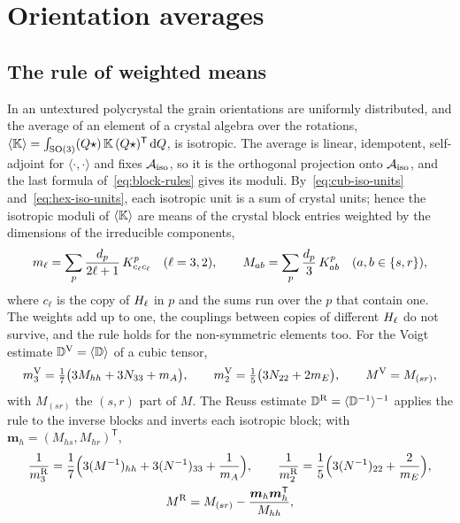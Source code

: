 \section{Orientation averages}\label{sec:averages}

\subsection{The rule of weighted means}\label{sec:averages-rule}

In an untextured polycrystal the grain orientations are uniformly distributed, and the
average of an element of a crystal algebra over the rotations,
$\langle \mathbb{K}\rangle=\int_{\mathrm{SO}(3)}(Q\star)\,\mathbb{K}\,(Q\star)^{\mathsf T}\,\mathrm{d} Q$, is isotropic. The
average is linear, idempotent, self-adjoint for $\langle\cdot,\cdot\rangle$ and fixes
$\mathcal{A}_{\mathrm{iso}}$, so it is the orthogonal projection onto $\mathcal{A}_{\mathrm{iso}}$, and the last
formula of~\eqref{eq:block-rules} gives its moduli. By~\eqref{eq:cub-iso-units}
and~\eqref{eq:hex-iso-units}, each isotropic unit is a sum of crystal units; hence the
isotropic moduli of $\langle \mathbb{K}\rangle$ are means of the crystal block entries weighted by the
dimensions of the irreducible components,
\begin{equation}
m_\ell=\sum_p\frac{d_{p}}{2\ell+1}\,K^p_{c_\ell c_\ell}\quad(\ell=3,2),\qquad
M_{ab}=\sum_p\frac{d_{p}}{3}\,K^p_{ab}\quad(a,b\in\{s,r\}),\label{eq:weighted-means}
\end{equation}
where $c_\ell$ is the copy of $H_{\ell}$ in $p$ and the sums run over the $p$ that
contain one. The weights add up to one, the couplings between copies of different
$H_{\ell}$ do not survive, and the rule holds for the non-symmetric elements too. For
the Voigt estimate $\mathbb{D}^{\mathrm{V}}=\langle \mathbb{D}\rangle$ of a cubic tensor,
\begin{equation}
m_3^{\mathrm{V}}=\tfrac17\big(3M_{hh}+3N_{33}+m_A\big),\qquad
m_2^{\mathrm{V}}=\tfrac15\big(3N_{22}+2m_E\big),\qquad M^{\mathrm{V}}=M_{(sr)},\label{eq:cub-voigt}
\end{equation}
with $M_{(sr)}$ the $(s,r)$ part of $M$. The Reuss estimate
$\mathbb{D}^{\mathrm{R}}=\langle \mathbb{D}^{-1}\rangle^{-1}$ applies the rule to the inverse blocks and inverts each
isotropic block; with $\bm m_h=(M_{hs},M_{hr})^{\mathsf T}$,
\begin{equation}
\begin{gathered}
\frac1{m_3^{\mathrm{R}}}=\frac17\Big(3(M^{-1})_{hh}+3(N^{-1})_{33}+\frac1{m_A}\Big),\qquad
\frac1{m_2^{\mathrm{R}}}=\frac15\Big(3(N^{-1})_{22}+\frac2{m_E}\Big),\\
M^{\mathrm{R}}=M_{(sr)}-\frac{\bm m_h\bm m_h^{\mathsf T}}{M_{hh}},
\end{gathered}\label{eq:cub-reuss}
\end{equation}
